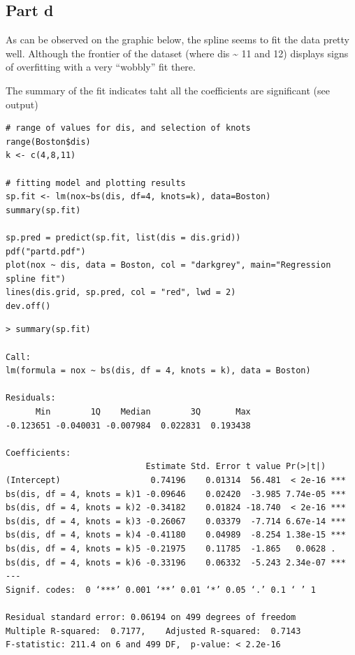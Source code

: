 \documentclass[11pt, a4paper]{article}
\begin{document}
\subsection{Part d}
\label{sec-2-4}

As can be observed on the graphic below, the spline seems to fit the
data pretty well. Although the frontier of the dataset (where dis \~{} 11
and 12) displays signs of overfitting with a very ``wobbly'' fit there.

The summary of the fit indicates taht all the coefficients are
significant (see output)


\begin{verbatim}
# range of values for dis, and selection of knots
range(Boston$dis)
k <- c(4,8,11)

# fitting model and plotting results
sp.fit <- lm(nox~bs(dis, df=4, knots=k), data=Boston)
summary(sp.fit)

sp.pred = predict(sp.fit, list(dis = dis.grid))
pdf("partd.pdf")
plot(nox ~ dis, data = Boston, col = "darkgrey", main="Regression spline fit")
lines(dis.grid, sp.pred, col = "red", lwd = 2)
dev.off()
\end{verbatim}


\begin{verbatim}
> summary(sp.fit)

Call:
lm(formula = nox ~ bs(dis, df = 4, knots = k), data = Boston)

Residuals:
      Min        1Q    Median        3Q       Max 
-0.123651 -0.040031 -0.007984  0.022831  0.193438 

Coefficients:
                            Estimate Std. Error t value Pr(>|t|)    
(Intercept)                  0.74196    0.01314  56.481  < 2e-16 ***
bs(dis, df = 4, knots = k)1 -0.09646    0.02420  -3.985 7.74e-05 ***
bs(dis, df = 4, knots = k)2 -0.34182    0.01824 -18.740  < 2e-16 ***
bs(dis, df = 4, knots = k)3 -0.26067    0.03379  -7.714 6.67e-14 ***
bs(dis, df = 4, knots = k)4 -0.41180    0.04989  -8.254 1.38e-15 ***
bs(dis, df = 4, knots = k)5 -0.21975    0.11785  -1.865   0.0628 .  
bs(dis, df = 4, knots = k)6 -0.33196    0.06332  -5.243 2.34e-07 ***
---
Signif. codes:  0 ‘***’ 0.001 ‘**’ 0.01 ‘*’ 0.05 ‘.’ 0.1 ‘ ’ 1

Residual standard error: 0.06194 on 499 degrees of freedom
Multiple R-squared:  0.7177,    Adjusted R-squared:  0.7143 
F-statistic: 211.4 on 6 and 499 DF,  p-value: < 2.2e-16
\end{verbatim}
\end{document}
